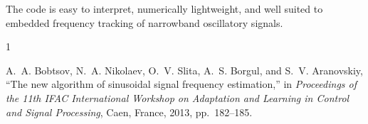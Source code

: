 \documentclass[conference]{IEEEtran}
\begin{document}
The code is easy to interpret, numerically lightweight, and well suited to
embedded frequency tracking of narrowband oscillatory signals.

\begin{thebibliography}{1}

A.~A. Bobtsov, N.~A. Nikolaev, O.~V. Slita, A.~S. Borgul, and
S.~V. Aranovskiy,
``The new algorithm of sinusoidal signal frequency estimation,''
in \emph{Proceedings of the 11th IFAC International Workshop on Adaptation
and Learning in Control and Signal Processing}, Caen, France, 2013,
pp.~182--185.

\end{thebibliography}
\end{document}
